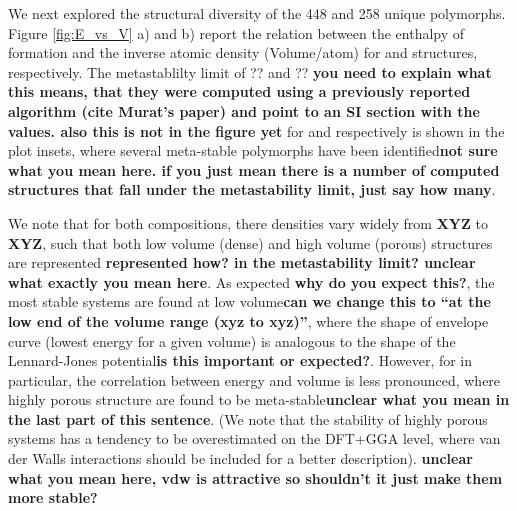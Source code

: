 %
We next explored the structural diversity of the 448 \IrOtwo and 258 \IrOthree unique polymorphs. Figure \ref{fig:E_vs_V} a) and b) report the relation between the enthalpy of formation and the inverse atomic density (Volume/atom) for \IrOtwo and \IrOthree structures, respectively. The metastablilty limit of ?? and ?? \textbf{you need to explain what this means, that they were computed using a previously reported algorithm (cite Murat's paper) and point to an SI section with the values.  also this is not in the figure yet} for \IrOtwo and \IrOthree respectively is shown in the plot insets, where several meta-stable polymorphs have been identified\textbf{not sure what you mean here.  if you just mean there is a number of computed structures that fall under the metastability limit, just say how many}.

We note that for both compositions, there densities vary widely from \textbf{XYZ} to \textbf{XYZ}, such that both low volume (dense) and high volume (porous) structures are represented \textbf{represented how?  in the metastability limit?  unclear what exactly you mean here}. As expected \textbf{why do you expect this?}, the most stable systems are found at low volume\textbf{can we change this to ``at the low end of the volume range (xyz to xyz)''}, where the shape of envelope curve (lowest energy for a given volume) is analogous to the shape of the Lennard-Jones potential\textbf{is this important or expected?}. However, for \IrOthree in particular, the correlation between energy and volume is less pronounced, where highly porous structure are found to be meta-stable\textbf{unclear what you mean in the last part of this sentence}. (We note that the stability of highly porous systems has a tendency to be overestimated on the DFT+GGA level, where van der Walls interactions should be included for a better description). \textbf{unclear what you mean here, vdw is attractive so shouldn't it just make them more stable?}

